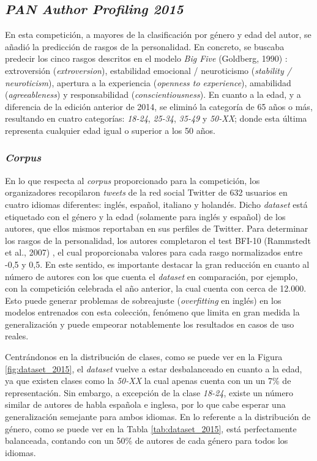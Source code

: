 \subsection{\textit{PAN Author Profiling 2015}}
\label{sec:pan_2015}

En esta competición, a mayores de la clasificación por género y edad del autor, se añadió la predicción de rasgos de la personalidad. En concreto,
se buscaba predecir los cinco rasgos descritos en el modelo \textit{Big Five} (Goldberg, 1990) \cite{goldberg1990alternative}: extroversión (\textit{extroversion}),
estabilidad emocional / neuroticismo (\textit{stability / neuroticism}), apertura a la experiencia (\textit{openness to experience}), amabilidad (\textit{agreeableness}) y
responsabilidad (\textit{conscientiousness}). En cuanto a la edad, y a diferencia de la edición anterior de 2014, se eliminó la categoría de 65 años o más,
resultando en cuatro categorías: \textit{18-24}, \textit{25-34}, \textit{35-49} y \textit{50-XX}; donde esta última representa cualquier edad igual o superior
a los 50 años.

\subsubsection{\textit{Corpus}}
\label{sec:pan_2015_corpus}

\bigskip
En lo que respecta al \textit{corpus} proporcionado para la competición, los organizadores recopilaron \textit{tweets} de la red social Twitter
de 632 usuarios en cuatro idiomas diferentes: inglés, español, italiano y holandés. Dicho \textit{dataset} está etiquetado con el género y la edad
(solamente para inglés y español) de los autores, que ellos mismos reportaban en sus perfiles de Twitter. Para determinar los rasgos de la personalidad,
los autores completaron el test BFI-10 (Rammstedt et al., 2007) \cite{rammstedt2007measuring}, el cual proporcionaba valores para cada rasgo normalizados entre -0,5 y 0,5.
En este sentido, es importante destacar la gran reducción en cuanto al número de autores con los que cuenta el \textit{dataset} en comparación, por ejemplo,
con la competición celebrada el año anterior, la cual cuenta con cerca de 12.000. Esto puede generar problemas de sobreajuste (\textit{overfitting} en inglés) en los modelos
entrenados con esta colección, fenómeno que limita en gran medida la generalización y puede empeorar notablemente los resultados en casos de uso reales.

\bigskip
Centrándonos en la distribución de clases, como se puede ver en la Figura \ref{fig:dataset_2015}, el \textit{dataset} vuelve a estar desbalanceado en cuanto a la edad, ya que existen
clases como la \textit{50-XX} la cual apenas cuenta con un un 7\% de representación. Sin embargo,
a excepción de la clase \textit{18-24}, existe un número similar de autores de habla española e inglesa, por lo que cabe esperar una generalización
semejante para ambos idiomas. En lo referente a la distribución de género, como se puede ver en la Tabla \ref{tab:dataset_2015}, está perfectamente balanceada,
contando con un 50\% de autores de cada género para todos los idiomas.

